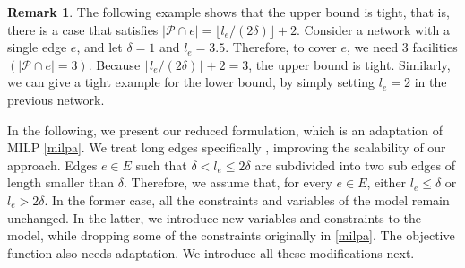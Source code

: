 \documentclass[review]{elsarticle}
\newcommand{\dlt}{{\delta}}
\theoremstyle{definition}
\newtheorem{remark}{Remark}[section]
\begin{document}
 \begin{remark}
The following example shows that the upper bound is tight, that is, there is a case that satisfies $|\mathcal{P} \cap e| =  \lfloor l_e/(2\delta)  \rfloor +2$. Consider a network with a single edge $e$, and let $\delta = 1 $ and $l_e = 3.5$. Therefore, to cover $e$, we need 3 facilities $(|\mathcal{P} \cap e |=3)$. Because $\lfloor l_e/(2\delta)  \rfloor +2 = 3$, the upper bound is tight. Similarly, we can give a tight example for the lower bound, by simply setting $l_e= 2$ in the previous  network.
\end{remark}


In the following, we present our reduced formulation, which is an adaptation of MILP \eqref{milpa}. We treat long edges specifically%
, improving the scalability of our approach. Edges $e\in E$ such that $\dlt < l_e \leq 2\dlt$ are subdivided  into two sub edges of length smaller than $\dlt$. Therefore, we assume that, for every $e\in E$, either $l_e\leq \dlt$ or $l_e> 2\dlt$. In the former case, all the constraints and variables of the model remain unchanged. In the latter, we introduce new variables and constraints to the model, while dropping some of the constraints originally in \eqref{milpa}. The objective function also needs adaptation. We introduce all these modifications next.
\end{document}

